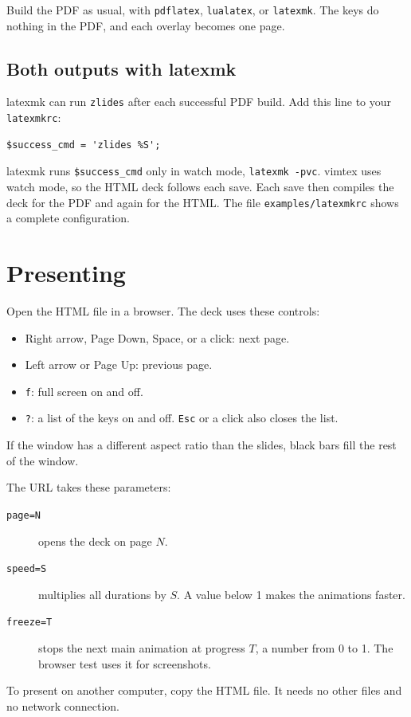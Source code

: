 \documentclass[11pt]{article}
\newcommand{\cmd}[1]{\texttt{#1}}
\begin{document}
Build the PDF as usual, with \cmd{pdflatex}, \cmd{lualatex}, or \cmd{latexmk}.
The keys do nothing in the PDF, and each overlay becomes one page.

\subsection{Both outputs with latexmk}

latexmk can run \cmd{zlides} after each successful PDF build. Add this line to
your \cmd{latexmkrc}:
\begin{lstlisting}
$success_cmd = 'zlides %S';
\end{lstlisting}
latexmk runs \cmd{\$success\_cmd} only in watch mode, \cmd{latexmk -pvc}. vimtex
uses watch mode, so the HTML deck follows each save. Each save then compiles the
deck for the PDF and again for the HTML. The file
\cmd{examples/latexmkrc} shows a complete configuration.

\section{Presenting}

Open the HTML file in a browser. The deck uses these controls:
\begin{itemize}
	\item Right arrow, Page Down, Space, or a click: next page.
	\item Left arrow or Page Up: previous page.
	\item \cmd{f}: full screen on and off.
	\item \cmd{?}: a list of the keys on and off. \cmd{Esc} or a click also closes
	      the list.
\end{itemize}

If the window has a different aspect ratio than the slides, black bars fill the
rest of the window.

The URL takes these parameters:
\begin{description}
	\item[\cmd{page=N}] opens the deck on page $N$.
	\item[\cmd{speed=S}] multiplies all durations by $S$. A value below 1 makes the
	      animations faster.
	\item[\cmd{freeze=T}] stops the next main animation at progress $T$, a number
	      from 0 to 1. The browser test uses it for screenshots.
\end{description}

To present on another computer, copy the HTML file. It needs no other files and
no network connection.
\end{document}
